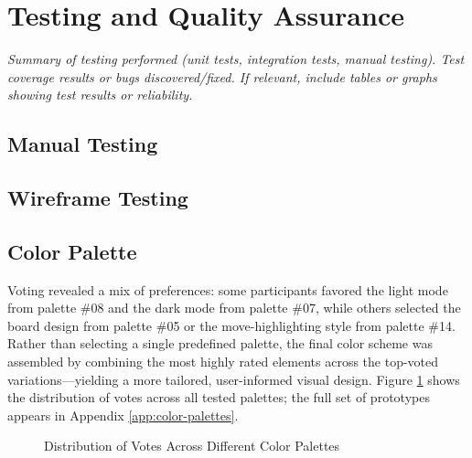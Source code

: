 \section{Testing and Quality Assurance}
\textit{Summary of testing performed (unit tests, integration tests, manual testing). Test coverage results or bugs discovered/fixed. If relevant, include tables or graphs showing test results or reliability.}

\subsection{Manual Testing}



\subsection{Wireframe Testing}



\subsection{Color Palette}
\label{subsec:results-color-palette}
Voting revealed a mix of preferences: some participants favored the light mode from palette \#08 and the dark mode from palette \#07, while others selected the board design from palette \#05 or the move-highlighting style from palette \#14. \\

Rather than selecting a single predefined palette, the final color scheme was assembled by combining the most highly rated elements across the top-voted variations—yielding a more tailored, user-informed visual design. Figure \ref{fig:color-palette-results} shows the distribution of votes across all tested palettes; the full set of prototypes appears in Appendix \ref{app:color-palettes}.

\begin{figure}[htbp]
\centering
{}
\caption{Distribution of Votes Across Different Color Palettes}
\label{fig:color-palette-results}
\end{figure}